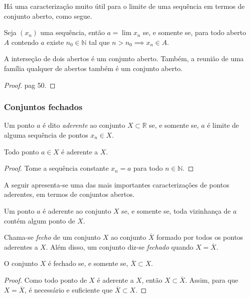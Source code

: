 Há uma caracterização muito útil para o limite de uma sequência em termos de conjunto aberto, como segue.
\begin{proposicao}
	Seja $(x_n)$ uma sequência, então $a = \lim x_n$ se, e somente se, para todo aberto $A$ contendo $a$ existe $n_0\in \mathbb{N}$ tal que $n>n_0 \implies x_n \in A$.
\end{proposicao}

\begin{proposicao}\label{prop:abertos}
	A interseção de dois abertos é um conjunto aberto. Também, a reunião de uma família qualquer de abertos também é um conjunto aberto.
	\begin{proof}
		\cite{elonAnalise1} pag 50.
	\end{proof}
\end{proposicao}

\subsubsection{Conjuntos fechados}

\begin{definicao}
	Um ponto $a$ é dito \textit{aderente} ao conjunto $X\subset \mathbb{R}$ se, e somente se, $a$ é limite de alguma sequência de pontos $x_n\in X$. 
\end{definicao}

\begin{proposicao}
	Todo ponto $a\in X$ é aderente a $X$.
	\begin{proof}
		Tome a sequência constante $x_n = a$ para todo $n\in \mathbb{N}$.
	\end{proof}
\end{proposicao}

A seguir apresenta-se uma das mais importantes caracterizações de  pontos aderentes, em termos de conjuntos abertos.
\begin{proposicao}
	Um ponto $a$ é aderente ao conjunto $X$ se, e somente se, toda vizinhança de $a$ contém algum ponto de $X$.
\end{proposicao}

\begin{definicao}
	Chama-se \textit{fecho} de um conjunto $X$ ao conjunto $\overline X$ formado por todos os pontos aderentes a $X$. Além disso, um conjunto diz-se \textit{fechado} quando $X = \overline X$.
\end{definicao}

\begin{proposicao}
	O conjunto $X$ é fechado se, e somente se, $\overline X \subset X$.
	\begin{proof}
		Como todo ponto de $X$ é aderente a $X$, então $X\subset \overline X$. Assim, para que $X = \overline X$, é necessário e suficiente que $\overline X \subset X$.
	\end{proof}
\end{proposicao}

